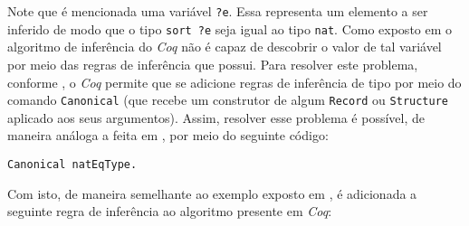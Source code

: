 Note que é mencionada uma variável \lstinline[language = coq]$?e$. Essa representa um elemento a ser inferido de modo que o tipo \lstinline[language = coq]$sort ?e$ seja igual ao tipo \lstinline[language = coq]$nat$. Como exposto em \cite{10.1007/978-3-642-39634-2_5} o algoritmo de inferência do \textit{Coq} não é capaz de descobrir o valor de tal variável por meio das regras de inferência que possui. Para resolver este problema, conforme \cite{assia_mahboubi_2022_7118596}, 
o \textit{Coq} permite que se adicione regras de inferência de tipo por meio do comando \lstinline[language = coq]$Canonical$ (que recebe um construtor de algum \lstinline[language = coq]$Record$ ou \lstinline[language = coq]$Structure$ aplicado aos seus argumentos). Assim, resolver esse problema é possível, de maneira análoga a feita em \cite{assia_mahboubi_2022_7118596}, por meio do seguinte código:
    \begin{lstlisting}[language=coq,frame=single,tabsize=1]
Canonical natEqType.
    \end{lstlisting}
Com isto, de maneira semelhante ao exemplo exposto em \cite{10.1007/978-3-642-39634-2_5}, é adicionada a seguinte regra de inferência ao algoritmo presente em \textit{Coq}:

